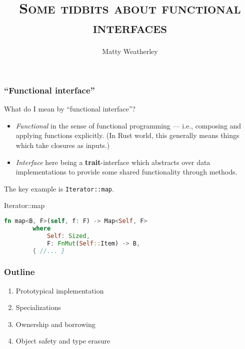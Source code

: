 \documentclass[10pt]{beamer}
\title{\textsc{Some tidbits about functional interfaces}}
\author{Matty Weatherley}
\date{}
\begin{document}

\maketitle

\begin{frame}[fragile]
    \frametitle{``Functional interface''}
    What do I mean by ``functional interface''?
	\begin{itemize}
		\item \textit{Functional} in the sense of functional programming --- i.e., composing and applying functions explicitly. (In Rust world, this generally means things which take closures as inputs.)\pause
		\item \textit{Interface} here being a \textbf{trait}-interface which abstracts over data implementations to provide some shared functionality through methods.\pause
	\end{itemize}
	
	The key example is \verb|Iterator::map|.
	\begin{block}{Iterator::map}
	\begin{lstlisting}[language=Rust, gobble=8]
        fn map<B, F>(self, f: F) -> Map<Self, F>
        where
            Self: Sized,
            F: FnMut(Self::Item) -> B,
        { //... }
	\end{lstlisting}
	\end{block}
	
\end{frame}

\begin{frame}
    \frametitle{Outline}
    \begin{enumerate}
        \item Prototypical implementation
        \item Specializations
        \item Ownership and borrowing
        \item Object safety and type erasure
    \end{enumerate} 
\end{frame}
\end{document}
